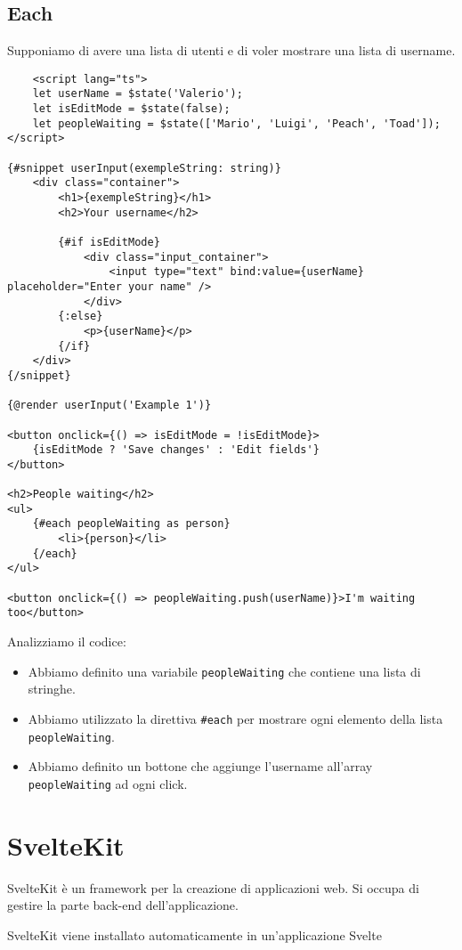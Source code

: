 \documentclass[12pt]{article}
\begin{document}
\subsection{Each}
Supponiamo di avere una lista di utenti e di voler mostrare
una lista di username.
\begin{verbatim}
    <script lang="ts">
    let userName = $state('Valerio');
    let isEditMode = $state(false);
    let peopleWaiting = $state(['Mario', 'Luigi', 'Peach', 'Toad']);
</script>

{#snippet userInput(exempleString: string)}
    <div class="container">
        <h1>{exempleString}</h1>
        <h2>Your username</h2>

        {#if isEditMode}
            <div class="input_container">
                <input type="text" bind:value={userName} placeholder="Enter your name" />
            </div>
        {:else}
            <p>{userName}</p>
        {/if}
    </div>
{/snippet}

{@render userInput('Example 1')}

<button onclick={() => isEditMode = !isEditMode}>
    {isEditMode ? 'Save changes' : 'Edit fields'}
</button>

<h2>People waiting</h2>
<ul>
    {#each peopleWaiting as person}
        <li>{person}</li>
    {/each}
</ul>

<button onclick={() => peopleWaiting.push(userName)}>I'm waiting too</button>
\end{verbatim}
Analizziamo il codice:
\begin{itemize}
    \item Abbiamo definito una variabile \texttt{peopleWaiting} che contiene
    una lista di stringhe.
    \item Abbiamo utilizzato la direttiva \texttt{\#each} per mostrare
    ogni elemento della lista \texttt{peopleWaiting}.
    \item Abbiamo definito un bottone che aggiunge l'username all'array
    \texttt{peopleWaiting} ad ogni click.
\end{itemize}



\pagebreak
\section{SvelteKit}
SvelteKit è un framework per la creazione di applicazioni web.
Si occupa di gestire la parte back-end
dell'applicazione.
\begin{highlight}
    SvelteKit viene installato automaticamente in un'applicazione
    Svelte
\end{highlight}
\end{document}
